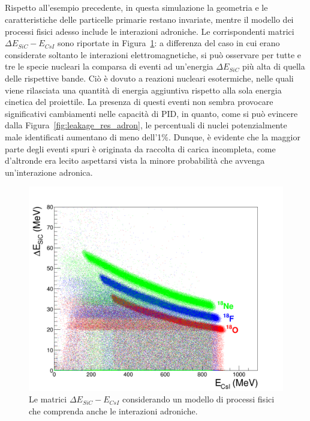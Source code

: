 
\subsection{} \label{par:interazioni_adroniche}






Rispetto all'esempio precedente, in questa simulazione la geometria e le caratteristiche delle particelle primarie restano invariate, mentre il modello dei processi fisici adesso include le interazioni adroniche. 
Le corrispondenti matrici $\Delta E_{SiC} - E_{CsI}$ sono riportate in Figura~\ref{fig:deltaE_ERes_adron}: a differenza del caso in cui erano considerate soltanto le interazioni elettromagnetiche, si può osservare per tutte e tre le specie nucleari la comparsa di eventi ad un'energia $\Delta E_{SiC}$ più alta di quella delle rispettive bande.
Ciò è dovuto a reazioni nucleari esotermiche, nelle quali viene rilasciata una quantità di energia aggiuntiva rispetto alla sola energia cinetica del proiettile.
La presenza di questi eventi non sembra provocare significativi cambiamenti nelle capacità di PID, in quanto, come si può evincere dalla Figura~\ref{fig:leakage_res_adron}, le percentuali di nuclei potenzialmente male identificati aumentano di meno dell'1\%. 
Dunque, è evidente che la maggior parte degli eventi spuri è originata da raccolta di carica incompleta, come d'altronde era lecito aspettarsi vista la minore probabilità che avvenga un'interazione adronica.


\begin{figure} [!p]
	\centering
	\includegraphics[width=\textwidth, keepaspectratio]{Grafici_Tesi/Interazioni_adroniche/deltaE_ERes.png}
	\caption{Le matrici $\Delta E_{SiC} - E_{CsI}$ considerando un modello di processi fisici che comprenda anche le interazioni adroniche.} \label{fig:deltaE_ERes_adron}
\end{figure}




